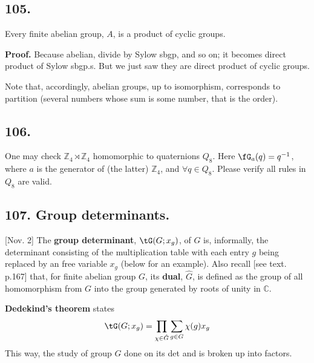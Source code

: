 \documentclass[12pt]{article}
\newcommand\Ev\forall%
\newcommand{\BF}[1]{ \mathbb{#1} }%
\newcommand{\Ss}[1]{\textsf{\textbf{#1}}}%
\newcommand{\EqGo}[1]{ \begin{gather*}{#1}\end{gather*} } %
\begin{document}
\subsection*{105.} Every finite abelian group, \(A\), is a product of cyclic groups. \par
\Ss{Proof.} Because abelian, divide by Sylow sbgp, and so on; 
it becomes direct product of Sylow sbgp.s. 
But we just saw they are direct product of cyclic groups. \par
Note that, accordingly, abelian groups, up to isomorphism, corresponds to partition (several numbers whose sum is some number, that is the order). 

\subsection*{106.} One may check \(\BF Z_4 \rtimes \BF Z_4\) homomorphic to quaternions \(Q_8\). 
Here \(\fG_a(q) = q^{-1}\), where \(a\) is the generator of (the latter) \(\BF Z_4\), and \(\Ev q \in Q_8\). 
Please verify all rules in \(Q_8\) are valid. 

\subsection*{107. Group determinants.} [Nov. 2] The \Ss{group determinant}, \(\tG(G;x_g)\), of \(G\) is, informally, the determinant consisting of the multiplication table with each entry \(g\) being replaced by an free variable \(x_g\) (below for an example). 
Also recall [see text. p.167] that, for finite abelian group \(G\), its \Ss{dual}, \(\hat{G}\), is defined as the group of all homomorphism from \(G\) into the group generated by roots of unity in \(\BF{C}\). \par
\Ss{Dedekind's theorem} states \EqGo{
 \tG(G;x_g) = \prod_{\chi \in \hat{G}} \sum_{g \in G} \chi(g) x_g
} This way, the study of group \(G\) done on its det and is broken up into factors. 
\end{document}

